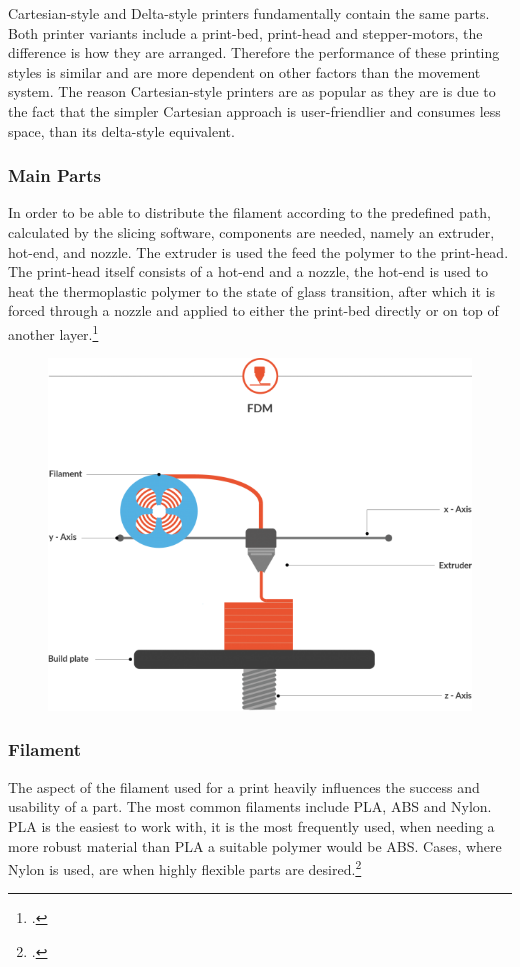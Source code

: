 Cartesian-style and Delta-style printers fundamentally contain the same parts. Both printer variants include a print-bed, print-head and stepper-motors, the difference is how they are arranged. Therefore the performance of these printing styles is similar and are more dependent on other factors than the movement system. The reason Cartesian-style printers are as popular as they are is due to the fact that the simpler Cartesian approach is user-friendlier and consumes less space, than its delta-style equivalent.\newline

\subsubsection{Main Parts}

In order to be able to distribute the filament according to the predefined path, calculated by the slicing software, components are needed, namely an extruder, hot-end, and nozzle. The extruder is used the feed the polymer to the print-head. The print-head itself consists of a hot-end and a nozzle, the hot-end is used to heat the thermoplastic polymer to the state of glass transition, after which it is forced through a nozzle and applied to either the print-bed directly or on top of another layer.\footcite{all3dpFDM3DPrinting2020}


\begin{figure}[h]
	\centering
	\includegraphics[width=0.5\linewidth]{img/FDM_Principle}
	\caption{}
	\label{fig:custom_parts_fdm_parts}
\end{figure}

\subsubsection{Filament}

The aspect of the filament used for a print heavily influences the success and usability of a part. The most common filaments include PLA, ABS and Nylon. PLA is the easiest to work with, it is the most frequently used, when needing a more robust material than PLA a suitable polymer would be ABS. Cases, where Nylon is used, are when highly flexible parts are desired.\footcite{hubsIntroToFDM3DPrintingNoDate}


